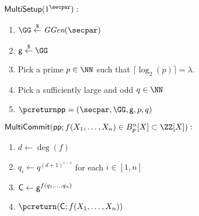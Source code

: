 \documentclass{article}
\theoremstyle{definition}
\begin{document}
 \begin{mdframed}[userdefinedwidth=\textwidth]
\begin{minipage}{\textwidth}
	\begin{flushleft}
	$\pro{MultiSetup}(1^\secpar):$
		\begin{enumerate}[nolistsep]
			\item $ \GG \sample \ggen(\secpar)$
			\item $ \gr{g} \sample \GG$
			\item Pick a prime $p\in \NN$ such that $\lceil\log_2(p)\rceil=\lambda$.
			\item Pick a sufficiently large and odd $q\in \NN$ 
			\item $\pcreturn \params = (\secpar,\GG,\gr{g},p,q)$
		\end{enumerate}
	$\pro{MultiCommit}(\crs;f(X_1,\dots,X_n) \in B_{p}^n[X]\subset \ZZ[X]):$ 		\begin{enumerate}[nolistsep]
			\item $d\gets \deg(f)$
			\item $q_i\gets q^{(d+1)^{i-1}}$ for each $i\in [1,n]$
			\item $\mathsf{C} \gets \mathsf{g}^{f(q_1,\dots,q_n)}$
			\item $\pcreturn (\gr{C};f(X_1,\dots,X_n))$
		\end{enumerate}
			\end{flushleft}
\end{minipage}
\end{mdframed}
 
\end{document}

